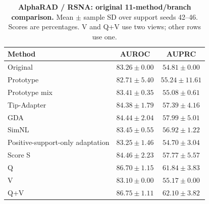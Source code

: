 \begin{table}[tp]
\centering
\caption{\textbf{AlphaRAD / RSNA: original 11-method/branch comparison.} Mean $\pm$ sample SD over support seeds 42--46. Scores are percentages. V and Q+V use two views; other rows use one.}
\label{tab:supp-oldmeans-alpharad-rsna_pneumonia}
\small
\setlength{\tabcolsep}{4pt}
\begin{tabular*}{\textwidth}{@{\extracolsep{\fill}}lcc@{}}
\toprule
Method & AUROC & AUPRC \\
\midrule
Original & $83.26\pm0.00$ & $54.81\pm0.00$ \\
Prototype & $82.71\pm5.40$ & $55.24\pm11.61$ \\
Prototype mix & $83.41\pm0.35$ & $55.08\pm0.61$ \\
Tip-Adapter & $84.38\pm1.79$ & $57.39\pm4.16$ \\
GDA & $84.44\pm2.04$ & $57.99\pm5.01$ \\
SimNL & $83.45\pm0.55$ & $56.92\pm1.22$ \\
Positive-support-only adaptation & $83.25\pm1.46$ & $54.70\pm3.04$ \\
Score S & $84.46\pm2.23$ & $57.77\pm5.57$ \\
Q & $86.70\pm1.15$ & $61.84\pm3.83$ \\
V & $83.10\pm0.00$ & $55.17\pm0.00$ \\
Q+V & $86.75\pm1.11$ & $62.10\pm3.82$ \\
\bottomrule
\end{tabular*}
\end{table}
